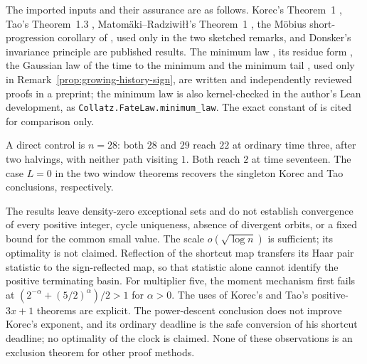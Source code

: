 \documentclass[11pt]{amsart}
\theoremstyle{definition}
\theoremstyle{remark}
\begin{document}
The imported inputs and their assurance are as follows. Korec's Theorem~1 \cite{Korec1994}, Tao's Theorem~1.3 \cite{Tao2022}, Matom\"aki--Radziwi\l\l's Theorem~1 \cite{MatomakiRadziwill2016}, the M\"obius short-progression corollary of \cite{KMT2023}, used only in the two sketched remarks, and Donsker's invariance principle \cite{Donsker1951} are published results. The minimum law \cite[Corollary~3.8]{BM}, its residue form \cite[Theorem~3]{BM}, the Gaussian law of the time to the minimum \cite[Corollary~1.1 and Remark~7.6]{BM} and the minimum tail \cite[Corollary~10.2]{BM}, used only in Remark~\ref{prop:growing-history-sign}, are written and independently reviewed proofs in a preprint; the minimum law is also kernel-checked in the author's Lean development, as \nolinkurl{Collatz.FateLaw.minimum_law}. The exact constant of \cite{Rates} is cited for comparison only.

A direct control is $n=28$: both $28$ and $29$ reach $22$ at ordinary time three, after two halvings, with neither path visiting $1$. Both reach $2$ at time seventeen. The case $L=0$ in the two window theorems recovers the singleton Korec and Tao conclusions, respectively.

The results leave density-zero exceptional sets and do not establish convergence of every positive integer, cycle uniqueness, absence of divergent orbits, or a fixed bound for the common small value. The scale $o(\sqrt{\log n})$ is sufficient; its optimality is not claimed.
Reflection of the shortcut map transfers its Haar pair statistic to the sign-reflected map, so that statistic alone cannot identify the positive terminating basin. For multiplier five, the moment mechanism first fails at
$(2^{-\alpha}+(5/2)^\alpha)/2>1$ for $\alpha>0$.
The uses of Korec's and Tao's positive-$3x+1$ theorems are explicit. The power-descent conclusion does not improve Korec's exponent, and its ordinary deadline is the safe conversion of his shortcut deadline; no optimality of the clock is claimed. None of these observations is an exclusion theorem for other proof methods.
\end{document}
